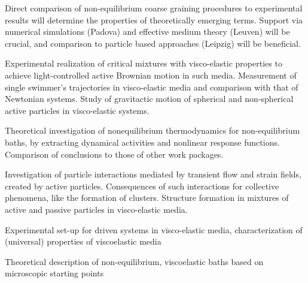\begin{workpackage}
\begin{tasklist}
\begin{task}[title=Theoretical identification of non-equilibrium signatures of the bath,id=brown-t3,PM=24,lead=USTUTT,wphases=0-24!1.0,partners={KUL,UNIPD,ULEI}]
Direct comparison of non-equilibrium coarse graining procedures to experimental results will
determine the properties of theoretically emerging terms. Support via numerical simulations
(Padova) and effective medium theory (Leuven) will be crucial, and comparison to particle
based approaches (Leipzig) will be beneficial.
\end{task}

\begin{task}[title=Self-propelled particles in visco-elastic baths,id=brown-t4,PM=24,lead=USTUTT,wphases=24-48!0.5]
Experimental realization of critical mixtures with visco-elastic properties to achieve light-controlled active Brownian motion in such media. Measurement of single swimmer's trajectories in visco-elastic media and comparison with that of Newtonian systems. Study of gravitactic motion of spherical and non-spherical active particles in visco-elastic systems. 
\end{task}
\begin{task}[title=Nonequilbrium thermodynamics,id=brown-t5,PM=24,lead=USTUTT,wphases=24-48!1.0,partners={KUL,UNIPD,ULEI}]
Theoretical investigation of nonequilibrium thermodynamics for non-equilibrium baths, by
extracting dynamical activities and nonlinear response functions. Comparison of conclusions
to those of other work packages.
\end{task}

\begin{task}[title=Collective behavior of self-propelled particles in visco-elastic baths,id=brown-t6,PM=24,lead=USTUTT,wphases=24-48!0.5]
Investigation of particle interactions mediated by transient flow and strain fields, created by active particles. Consequences of such interactions for collective phenomena, like the formation of clusters. Structure formation in mixtures of active and passive particles in visco-elastic media.  
\end{task}


\end{tasklist}

\begin{wpdelivs}
  \begin{wpdeliv}[due=24,id=brown-d1,dissem=PU,nature=DEM,lead=USTUTT]
      {Experimental set-up for driven systems in visco-elastic media, characterization of (universal) properties of viscoelastic media}
  \end{wpdeliv}
  \begin{wpdeliv}[due=24,id=brown-d2,dissem=PU,nature=DEM,lead=USTUTT]
      {Theoretical description of non-equilibrium, viscoelastic baths based on microscopic starting points}
\end{wpdeliv}
 

\end{wpdelivs}
\end{workpackage}
